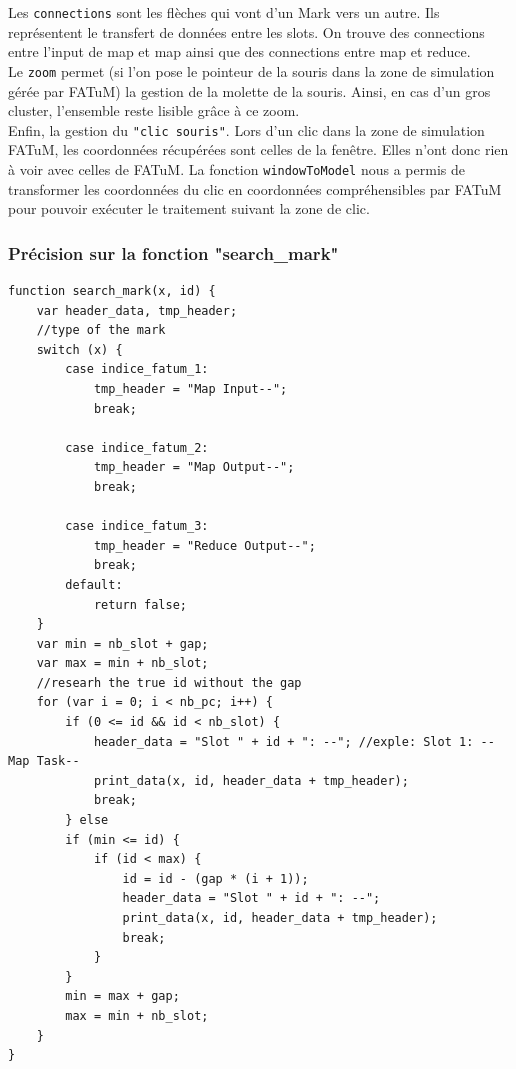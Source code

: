 Les {\tt connections} sont les flèches qui vont d'un Mark vers un autre. Ils représentent le transfert de données entre les slots. On trouve des connections entre l'input de map et map ainsi que des connections entre map et reduce.\\

Le {\tt zoom} permet (si l'on pose le pointeur de la souris dans la zone de simulation gérée par FATuM) la gestion de la molette de la souris. Ainsi, en cas d'un gros cluster, l'ensemble reste lisible grâce à ce zoom. \\

Enfin, la gestion du {\tt "clic souris"}. Lors d'un clic dans la zone de simulation FATuM, les coordonnées récupérées sont celles de la fenêtre. Elles n'ont donc rien à voir avec celles de FATuM. La fonction {\tt windowToModel} nous a permis de transformer les coordonnées du clic en coordonnées compréhensibles par FATuM pour pouvoir exécuter le traitement suivant la zone de clic.


\subsubsection{Précision sur la fonction "search\_mark"}

\begin{lstlisting}
function search_mark(x, id) {
    var header_data, tmp_header;
    //type of the mark
    switch (x) {
        case indice_fatum_1:
            tmp_header = "Map Input--";
            break;

        case indice_fatum_2:
            tmp_header = "Map Output--";
            break;

        case indice_fatum_3:
            tmp_header = "Reduce Output--";
            break;
        default:
            return false;
    }
    var min = nb_slot + gap;
    var max = min + nb_slot;
    //researh the true id without the gap
    for (var i = 0; i < nb_pc; i++) {
        if (0 <= id && id < nb_slot) {
            header_data = "Slot " + id + ": --"; //exple: Slot 1: --Map Task--
            print_data(x, id, header_data + tmp_header);
            break;
        } else
        if (min <= id) {
            if (id < max) {
                id = id - (gap * (i + 1));
                header_data = "Slot " + id + ": --";
                print_data(x, id, header_data + tmp_header);
                break;
            }
        }
        min = max + gap;
        max = min + nb_slot;
    }
}
\end{lstlisting}

